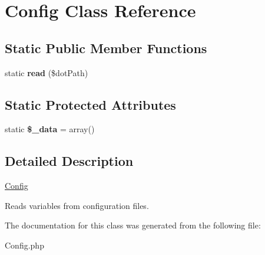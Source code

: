 \hypertarget{classConfig}{
\section{Config Class Reference}
\label{classConfig}
}
\subsection*{Static Public Member Functions}
\begin{DoxyCompactItemize}
\item 
\hypertarget{classConfig_a25bd8da6939a4173a5eb6b55281c02da}{
static {\bfseries read} (\$dotPath)}
\label{classConfig_a25bd8da6939a4173a5eb6b55281c02da}

\end{DoxyCompactItemize}
\subsection*{Static Protected Attributes}
\begin{DoxyCompactItemize}
\item 
\hypertarget{classConfig_aec55d9da7c6ae27a0568e01b0060b9ed}{
static {\bfseries \$\_\-data} = array()}
\label{classConfig_aec55d9da7c6ae27a0568e01b0060b9ed}

\end{DoxyCompactItemize}


\subsection{Detailed Description}
\hyperlink{classConfig}{Config}

Reads variables from configuration files. 

The documentation for this class was generated from the following file:\begin{DoxyCompactItemize}
\item 
Config.php\end{DoxyCompactItemize}
